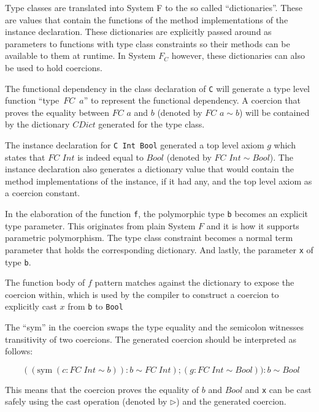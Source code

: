 Type classes are translated into System F to the so called ``dictionaries''.
These are values that contain the functions of the method implementations of the
instance declaration. These dictionaries are explicitly passed around as
parameters to functions with type class constraints so their methods can be
available to them at runtime. In System $F_C$ however, these dictionaries can
also be used to hold coercions.

The functional dependency in the class declaration of \texttt{C} will generate a
type level function ``type~$FC$~$a$'' to represent the functional dependency. A
coercion that proves the equality between $FC$ $a$ and $b$ (denoted by $FC$ $a
\sim b$) will be contained by the dictionary $CDict$ generated for the type
class.

The instance declaration for \texttt{C Int Bool} generated a top level axiom
$g$ which states that $FC$ $Int$ is indeed equal to $Bool$ (denoted by $FC$ $Int
\sim Bool$). The instance declaration also generates a dictionary value that
would contain the method implementations of the instance, if it had any, and the top
level axiom as a coercion constant.

In the elaboration of the function \texttt{f}, the polymorphic type \texttt{b}
becomes an explicit type parameter. This originates from plain System $F$ and it
is how it supports parametric polymorphism. The type class constraint becomes a
normal term parameter that holds the corresponding dictionary. And lastly, the
parameter \texttt{x} of type \texttt{b}.

The function body of $f$ pattern matches against the dictionary to expose the
coercion within, which is used by the compiler to construct a coercion to
explicitly cast $x$ from \texttt{b} to \texttt{Bool}

The ``sym'' in the coercion swaps the type equality and the semicolon witnesses
transitivity of two coercions. The generated coercion should be interpreted as follows:

$\quad\quad((\text{sym} \; (c : FC \; Int \sim b)) : b \sim FC \; Int) ; (g : FC
\; Int \sim Bool) ) : b \sim Bool$

This means that the coercion proves the equality of $b$ and $Bool$ and
\texttt{x} can be cast safely using the cast operation (denoted by
$\triangleright$) and the generated coercion.
